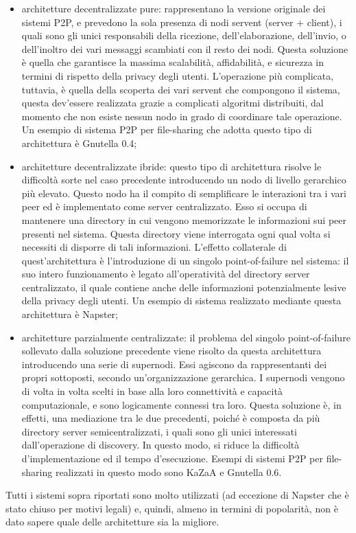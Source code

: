 \begin{itemize}
\item architetture decentralizzate pure: rappresentano la versione originale dei sistemi P2P, e prevedono la sola presenza di nodi servent (server + client), i quali sono gli unici responsabili della ricezione, dell’elaborazione, dell’invio, o dell’inoltro dei vari messaggi scambiati con il resto dei nodi. Questa soluzione è quella che garantisce la massima scalabilità, affidabilità, e sicurezza in termini di rispetto della privacy degli utenti. L’operazione più complicata, tuttavia, è quella della scoperta dei vari servent che compongono il sistema, questa dev'essere realizzata grazie a complicati algoritmi distribuiti, dal momento che non esiste nessun nodo in grado di coordinare tale operazione. Un esempio di sistema P2P per file-sharing che adotta questo tipo di architettura è Gnutella 0.4;
\item architetture decentralizzate ibride: questo tipo di architettura risolve le difficoltà sorte nel caso precedente introducendo un nodo di livello gerarchico più elevato. Questo nodo ha il compito di semplificare le interazioni tra i vari peer ed è implementato come server centralizzato. Esso si occupa di mantenere una directory in cui vengono memorizzate le informazioni sui peer presenti nel sistema. Questa directory viene interrogata ogni qual volta si necessiti di disporre di tali informazioni. L’effetto collaterale di quest'architettura è l’introduzione di un singolo 
point-of-failure nel sistema: il suo intero funzionamento è legato all’operatività del directory server centralizzato, il quale contiene anche delle informazioni potenzialmente lesive della privacy degli utenti. Un esempio di sistema realizzato mediante questa architettura è Napster;
\item architetture parzialmente centralizzate: il problema del singolo point-of-failure sollevato dalla soluzione precedente viene risolto da questa architettura introducendo una serie di supernodi. Essi agiscono da rappresentanti dei propri sottoposti, secondo un’organizzazione gerarchica. I supernodi vengono di volta in volta scelti in base alla loro connettività e capacità computazionale, e sono logicamente connessi tra loro. Questa soluzione è, in effetti, una mediazione tra le due precedenti, poiché è composta da più directory server semicentralizzati, i quali sono gli unici interessati dall’operazione di discovery. In questo modo, si riduce la difficoltà d'implementazione ed il tempo d'esecuzione. Esempi di sistemi P2P per file-sharing realizzati in questo modo sono KaZaA e Gnutella 0.6.
\end{itemize}
Tutti i sistemi sopra riportati sono molto utilizzati (ad eccezione di Napster che è stato chiuso per motivi legali) e, quindi, almeno in termini di popolarità, non è dato sapere quale delle architetture sia la migliore.